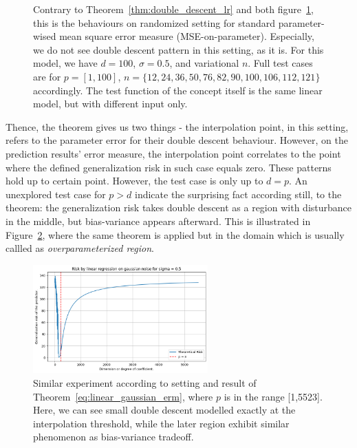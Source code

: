\documentclass[10pt,oneside,oldfontcommands,dvipsnames,article]{memoir}
\begin{document}
\begin{figure}[htb]
  \caption{Contrary to Theorem~\ref{thm:double_descent_lr} and both figure~\ref{fig:11grid2}, this is the behaviours on randomized setting for standard parameter-wised mean square error measure (MSE-on-parameter). Especially, we do not see double descent pattern in this setting, as it is. For this model, we have $d=100$, $\sigma = 0.5$, and variational $n$. Full test cases are for $p=[1,100]$, $n=\{12,24,36,50,76,82,90,100,106,112,121\}$ accordingly. The test function of the concept itself is the same linear model, but with different input only.}
  \label{fig:11grid2}
\end{figure}

Thence, the theorem gives us two things - the interpolation point, in this setting, refers to the parameter error for their double descent behaviour. However, on the prediction results' error measure, the interpolation point correlates to the point where the defined generalization risk in such case equals zero. These patterns hold up to certain point. However, the test case is only up to $d=p$. An unexplored test case for $p>d$ indicate the surprising fact according still, to the theorem: the generalization risk takes double descent as a region with disturbance in the middle, but bias-variance appears afterward. This is illustrated in Figure~\ref{fig:contrarian}, where the same theorem is applied but in the domain which is usually callled as \textit{overparameterized region}. 
\begin{figure}[htp]
  \centering
  \includegraphics[width=0.6\textwidth]{img/dimensional_descent.png}
  \caption{Similar experiment according to setting and result of Theorem~\ref{eq:linear_gaussian_erm}, where $p$ is in the range [1,5523]. Here, we can see small double descent modelled exactly at the interpolation threshold, while the later region exhibit similar phenomenon as bias-variance tradeoff.}
  \label{fig:contrarian}
\end{figure}
\end{document}

